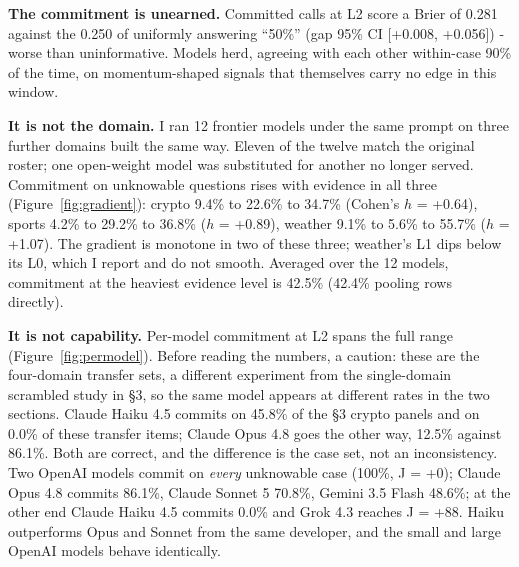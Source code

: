\documentclass[10pt]{article}
\begin{document}
\textbf{The commitment is unearned.} Committed calls at L2 score a Brier of 0.281 against the 0.250 of uniformly answering ``50\%'' (gap 95\% CI [+0.008, +0.056]) - worse than uninformative. Models herd, agreeing with each other within-case 90\% of the time, on momentum-shaped signals that themselves carry no edge in this window.

\textbf{It is not the domain.} I ran 12 frontier models under the same prompt on three further domains built the same way. Eleven of the twelve match the original roster; one open-weight model was substituted for another no longer served. Commitment on unknowable questions rises with evidence in all three (Figure~\ref{fig:gradient}): crypto 9.4\% to 22.6\% to 34.7\% (Cohen's $h$ = +0.64), sports 4.2\% to 29.2\% to 36.8\% ($h$ = +0.89), weather 9.1\% to 5.6\% to 55.7\% ($h$ = +1.07). The gradient is monotone in two of these three; weather's L1 dips below its L0, which I report and do not smooth. Averaged over the 12 models, commitment at the heaviest evidence level is 42.5\% (42.4\% pooling rows directly).

\textbf{It is not capability.} Per-model commitment at L2 spans the full range (Figure~\ref{fig:permodel}). Before reading the numbers, a caution: these are the four-domain transfer sets, a different experiment from the single-domain scrambled study in \S3, so the same model appears at different rates in the two sections. Claude Haiku 4.5 commits on 45.8\% of the \S3 crypto panels and on 0.0\% of these transfer items; Claude Opus 4.8 goes the other way, 12.5\% against 86.1\%. Both are correct, and the difference is the case set, not an inconsistency. Two OpenAI models commit on \textit{every} unknowable case (100\%, J = +0); Claude Opus 4.8 commits 86.1\%, Claude Sonnet 5 70.8\%, Gemini 3.5 Flash 48.6\%; at the other end Claude Haiku 4.5 commits 0.0\% and Grok 4.3 reaches J = +88. Haiku outperforms Opus and Sonnet from the same developer, and the small and large OpenAI models behave identically.
\end{document}
